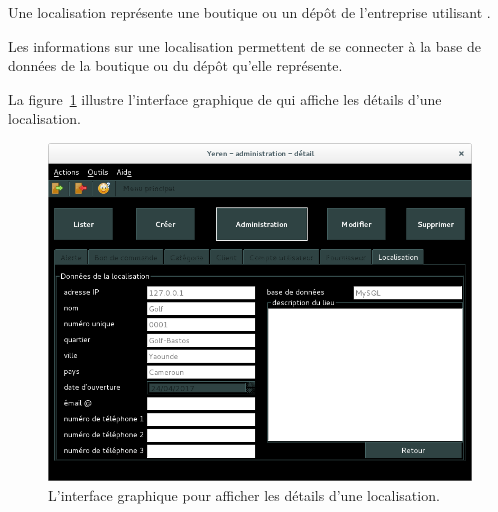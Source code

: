 
Une localisation repr\'esente une boutique ou un d\'ep\^ot
de l'entreprise utilisant \yeroth.

Les informations sur une localisation permettent de
se connecter \`a la base de donn\'ees de la boutique
ou du d\'ep\^ot qu'elle repr\'esente.


La figure~\ref{fig:admin-localisations-afficher-details} illustre
l'interface graphique de \yeroth qui affiche les d\'etails
d'une localisation.\\

\begin{figure}[!htpb]
	\centering
	\includegraphics[scale=0.45]{images/localisation-afficher-details.png}
	\caption{L'interface graphique pour afficher les d\'etails
			d'une localisation.}
	\label{fig:admin-localisations-afficher-details}
\end{figure}

